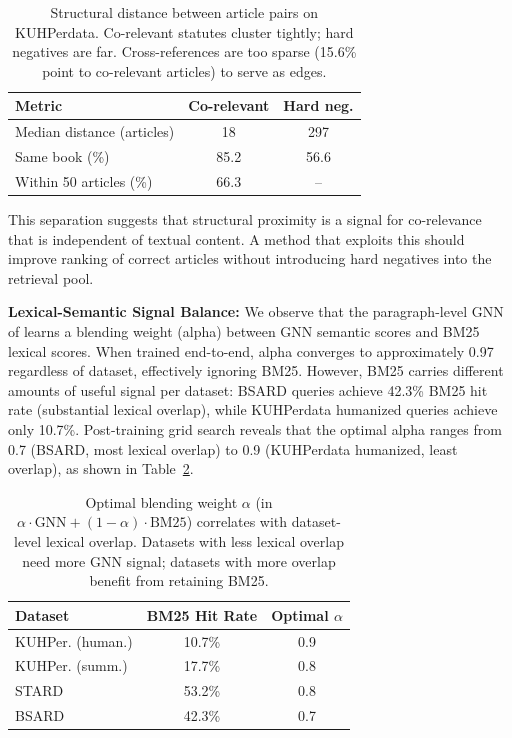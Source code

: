 \begin{table}[t]
\centering
\small
\begin{tabular}{lcc}
\hline
\textbf{Metric} & \textbf{Co-relevant} & \textbf{Hard neg.} \\
\hline
Median distance (articles) & 18 & 297 \\
Same book (\%) & 85.2 & 56.6 \\
Within 50 articles (\%) & 66.3 & -- \\
\hline
\end{tabular}
\caption{\label{tab:structural-distance}
Structural distance between article pairs on KUHPerdata. Co-relevant statutes cluster tightly; hard negatives are far. Cross-references are too sparse (15.6\% point to co-relevant articles) to serve as edges.
}
\end{table}

This separation suggests that structural proximity is a signal for co-relevance that is independent of textual content. A method that exploits this should improve ranking of correct articles without introducing hard negatives into the retrieval pool.

\noindent\textbf{Lexical-Semantic Signal Balance:} We observe that the paragraph-level GNN of \citet{ilpcsr} learns a blending weight (alpha) between GNN semantic scores and BM25 lexical scores. When trained end-to-end, alpha converges to approximately 0.97 regardless of dataset, effectively ignoring BM25. However, BM25 carries different amounts of useful signal per dataset: BSARD queries achieve 42.3\% BM25 hit rate (substantial lexical overlap), while KUHPerdata humanized queries achieve only 10.7\%. Post-training grid search reveals that the optimal alpha ranges from 0.7 (BSARD, most lexical overlap) to 0.9 (KUHPerdata humanized, least overlap), as shown in Table~\ref{tab:alpha-correlation}.

\begin{table}[t]
\centering
\small
\begin{tabular}{lcc}
\hline
\textbf{Dataset} & \textbf{BM25 Hit Rate} & \textbf{Optimal $\alpha$} \\
\hline
KUHPer. (human.) & 10.7\% & 0.9 \\
KUHPer. (summ.) & 17.7\% & 0.8 \\
STARD & 53.2\% & 0.8 \\
BSARD & 42.3\% & 0.7 \\
\hline
\end{tabular}
\caption{\label{tab:alpha-correlation}
Optimal blending weight $\alpha$ (in $\alpha \cdot \text{GNN} + (1-\alpha) \cdot \text{BM25}$) correlates with dataset-level lexical overlap. Datasets with less lexical overlap need more GNN signal; datasets with more overlap benefit from retaining BM25.
}
\end{table}

